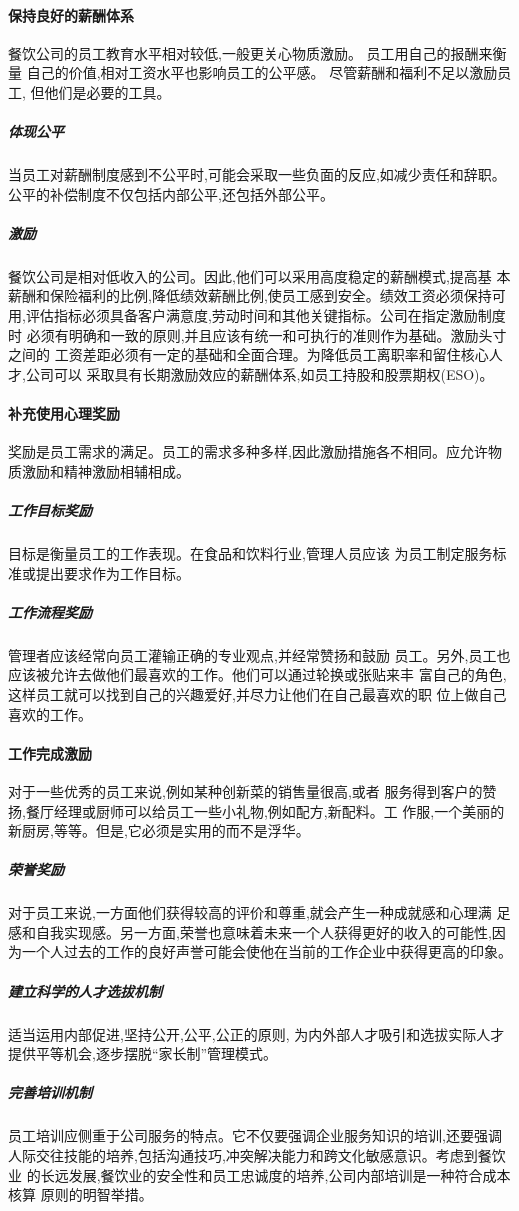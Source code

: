 \paragraph{保持良好的薪酬体系}
餐饮公司的员工教育水平相对较低,一般更关心物质激励。 员工用自己的报酬来衡量
自己的价值,相对工资水平也影响员工的公平感。 尽管薪酬和福利不足以激励员工,
但他们是必要的工具。

\subparagraph{体现公平}
当员工对薪酬制度感到不公平时,可能会采取一些负面的反应,如减少责任和辞职。
公平的补偿制度不仅包括内部公平,还包括外部公平。

\subparagraph{激励}
餐饮公司是相对低收入的公司。因此,他们可以采用高度稳定的薪酬模式,提高基
本薪酬和保险福利的比例,降低绩效薪酬比例,使员工感到安全。绩效工资必须保持可
用,评估指标必须具备客户满意度,劳动时间和其他关键指标。公司在指定激励制度时
必须有明确和一致的原则,并且应该有统一和可执行的准则作为基础。激励头寸之间的
工资差距必须有一定的基础和全面合理。为降低员工离职率和留住核心人才,公司可以
采取具有长期激励效应的薪酬体系,如员工持股和股票期权(ESO)。

\paragraph{补充使用心理奖励}
奖励是员工需求的满足。员工的需求多种多样,因此激励措施各不相同。应允许物
质激励和精神激励相辅相成。

\subparagraph{工作目标奖励}
目标是衡量员工的工作表现。在食品和饮料行业,管理人员应该
为员工制定服务标准或提出要求作为工作目标。

\subparagraph{工作流程奖励}
管理者应该经常向员工灌输正确的专业观点,并经常赞扬和鼓励
员工。另外,员工也应该被允许去做他们最喜欢的工作。他们可以通过轮换或张贴来丰
富自己的角色,这样员工就可以找到自己的兴趣爱好,并尽力让他们在自己最喜欢的职
位上做自己喜欢的工作。

\paragraph{工作完成激励}
对于一些优秀的员工来说,例如某种创新菜的销售量很高,或者
服务得到客户的赞扬,餐厅经理或厨师可以给员工一些小礼物,例如配方,新配料。工
作服,一个美丽的新厨房,等等。但是,它必须是实用的而不是浮华。

\subparagraph{荣誉奖励}
对于员工来说,一方面他们获得较高的评价和尊重,就会产生一种成就感和心理满
足感和自我实现感。另一方面,荣誉也意味着未来一个人获得更好的收入的可能性,因
为一个人过去的工作的良好声誉可能会使他在当前的工作企业中获得更高的印象。

\subparagraph{建立科学的人才选拔机制}
适当运用内部促进,坚持公开,公平,公正的原则,
为内外部人才吸引和选拔实际人才提供平等机会,逐步摆脱“家长制”管理模式。

\subparagraph{完善培训机制}
员工培训应侧重于公司服务的特点。它不仅要强调企业服务知识的培训,还要强调
人际交往技能的培养,包括沟通技巧,冲突解决能力和跨文化敏感意识。考虑到餐饮业
的长远发展,餐饮业的安全性和员工忠诚度的培养,公司内部培训是一种符合成本核算
原则的明智举措。
